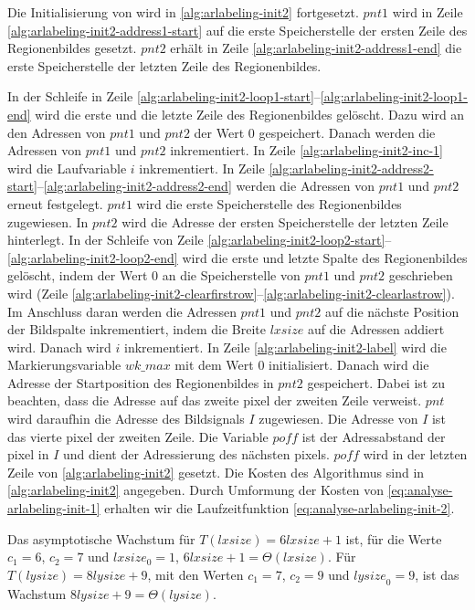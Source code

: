 Die Initialisierung von  wird in \autoref{alg:arlabeling-init2} fortgesetzt.
$\mathit{pnt1}$ wird in Zeile \ref{alg:arlabeling-init2-address1-start} auf die erste Speicherstelle der ersten Zeile
 des Regionenbildes gesetzt. $\mathit{pnt2}$ erhält in Zeile \ref{alg:arlabeling-init2-address1-end} die erste
 Speicherstelle der letzten Zeile des Regionenbildes.

In der Schleife in Zeile \ref{alg:arlabeling-init2-loop1-start}--\ref{alg:arlabeling-init2-loop1-end} wird die erste
 und die letzte Zeile des Regionenbildes gelöscht. Dazu wird an den Adressen von
 $\mathit{pnt1}$ und $\mathit{pnt2}$ der Wert $0$ gespeichert. Danach werden die Adressen von $\mathit{pnt1}$ und
 $\mathit{pnt2}$ inkrementiert. In Zeile \ref{alg:arlabeling-init2-inc-1} wird die Laufvariable $i$ inkrementiert. In
 Zeile \ref{alg:arlabeling-init2-address2-start}--\ref{alg:arlabeling-init2-address2-end} werden die Adressen
 von $\mathit{pnt1}$ und $\mathit{pnt2}$ erneut festgelegt. $\mathit{pnt1}$ wird die erste Speicherstelle des
 Regionenbildes zugewiesen. In $\mathit{pnt2}$ wird die Adresse der ersten Speicherstelle der letzten Zeile hinterlegt.
 In der Schleife von Zeile \ref{alg:arlabeling-init2-loop2-start}--\ref{alg:arlabeling-init2-loop2-end} wird die erste
 und letzte Spalte des Regionenbildes gelöscht, indem der Wert $0$ an die Speicherstelle von $\mathit{pnt1}$ und
 $\mathit{pnt2}$ geschrieben wird
 (Zeile \ref{alg:arlabeling-init2-clearfirstrow}--\ref{alg:arlabeling-init2-clearlastrow}). Im Anschluss daran werden
 die Adressen $\mathit{pnt1}$ und $\mathit{pnt2}$ auf die nächste Position der Bildspalte inkrementiert, indem die
 Breite $\mathit{lxsize}$ auf die Adressen addiert wird. Danach wird $i$ inkrementiert. In Zeile
 \ref{alg:arlabeling-init2-label} wird die Markierungsvariable $\mathit{wk\_max}$ mit dem Wert $0$ initialisiert.
 Danach wird die Adresse der Startposition des Regionenbildes in $\mathit{pnt2}$ gespeichert. Dabei ist zu beachten,
 dass die Adresse auf das zweite \gls{pixel} der zweiten Zeile verweist. $\mathit{pnt}$ wird daraufhin die Adresse des
 Bildsignals $I$ zugewiesen. Die Adresse von $I$ ist das vierte \gls{pixel} der zweiten Zeile. Die Variable
 $\mathit{poff}$ ist der Adressabstand der \gls{pixel} in $I$ und dient der Adressierung des nächsten \glspl{pixel}.
 $\mathit{poff}$ wird in der letzten Zeile von \autoref{alg:arlabeling-init2} gesetzt. Die Kosten des Algorithmus sind
 in \autoref{alg:arlabeling-init2} angegeben. Durch Umformung der Kosten von \autoref{eq:analyse-arlabeling-init-1}
 erhalten wir die Laufzeitfunktion \autoref{eq:analyse-arlabeling-init-2}.

Das asymptotische Wachstum für $T(\mathit{lxsize}) = 6\mathit{lxsize} + 1$ ist, für die Werte $c_{1} = 6$,
 $c_{2} = 7$ und $\mathit{lxsize}_{0} = 1$, $6\mathit{lxsize} + 1 = \Theta(lxsize)$. Für
 $T(\mathit{lysize}) = 8\mathit{lysize} + 9$, mit den Werten $c_{1} = 7$, $c_{2} = 9$ und $\mathit{lysize}_{0} = 9$,
 ist das Wachstum $8\mathit{lysize} + 9 = \Theta(lysize)$.

